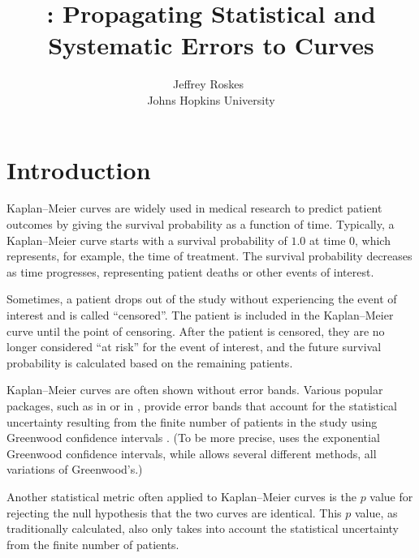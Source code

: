 \documentclass[article]{jss}
\author{Jeffrey Roskes~\orcidlink{0000-0001-8761-0490}\\Johns Hopkins University} %
\title{\pkg{KoMbine}: Propagating Statistical and Systematic Errors to \KM{} Curves}
\newcommand{\KM}{Kaplan--Meier} %
\begin{document}


\section{Introduction}\label{sec:intro}

\KM{} curves are widely used in medical research to predict patient outcomes by giving the survival probability as a function of time.  Typically, a \KM{} curve starts with a survival probability of \(1.0\) at time \(0\), which represents, for example, the time of treatment.  The survival probability decreases as time progresses, representing patient deaths or other events of interest.

Sometimes, a patient drops out of the study without experiencing the event of interest and is called ``censored''.  The patient is included in the \KM{} curve until the point of censoring.  After the patient is censored, they are no longer considered ``at risk'' for the event of interest, and the future survival probability is calculated based on the remaining patients.

\KM{} curves are often shown without error bands.  Various popular packages, such as  \citep{survival-package} in  \citep{R} or  \citep{lifelines} in , provide error bands that account for the statistical uncertainty resulting from the finite number of patients in the study using Greenwood confidence intervals \citep{GreenwoodNotes,Greenwood}.  (To be more precise,  uses the exponential Greenwood confidence intervals, while  allows several different methods, all variations of Greenwood's.)

Another statistical metric often applied to \KM{} curves is the \(p\) value for rejecting the null hypothesis that the two curves are identical.  This \(p\) value, as traditionally calculated, also only takes into account the statistical uncertainty from the finite number of patients.
\end{document}
